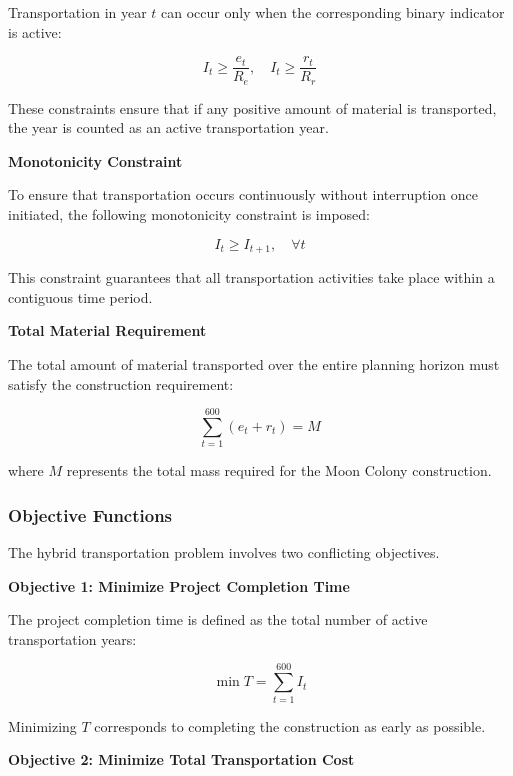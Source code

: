 \documentclass{mcmthesis}
\begin{document}
Transportation in year $t$ can occur only when the corresponding binary indicator is active:

\begin{equation}
    I_t \ge \frac{e_t}{R_e}, \quad I_t \ge \frac{r_t}{R_r}
\end{equation}

These constraints ensure that if any positive amount of material is transported, the year is counted as an active transportation year.


\textbf{Monotonicity Constraint}

To ensure that transportation occurs continuously without interruption once initiated, the following monotonicity constraint is imposed:

\begin{equation}
    I_t \ge I_{t+1}, \quad \forall t
\end{equation}

This constraint guarantees that all transportation activities take place within a contiguous time period.

\textbf{Total Material Requirement}

The total amount of material transported over the entire planning horizon must satisfy the construction requirement:

\begin{equation}
    \sum_{t=1}^{600} \left( e_t + r_t \right) = M
\end{equation}

where $M$ represents the total mass required for the Moon Colony construction.


\subsubsection{Objective Functions}

The hybrid transportation problem involves two conflicting objectives.

\textbf{Objective 1: Minimize Project Completion Time}

The project completion time is defined as the total number of active transportation years:

\begin{equation}
    \min T = \sum_{t=1}^{600} I_t
\end{equation}

Minimizing $T$ corresponds to completing the construction as early as possible.


\textbf{Objective 2: Minimize Total Transportation Cost}
\end{document}
